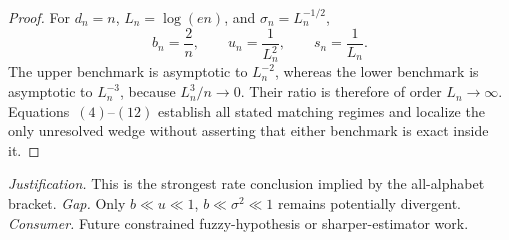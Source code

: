 \documentclass{article}
\begin{document}
\begin{proof}
For \(d_n=n\), \(L_n=\log(en)\), and \(\sigma_n=L_n^{-1/2}\),
\[
 b_n=\frac2n,\qquad u_n=\frac1{L_n^2},\qquad s_n=\frac1{L_n}.
\tag{13}
\]
The upper benchmark is asymptotic to \(L_n^{-2}\), whereas the lower benchmark is asymptotic to \(L_n^{-3}\), because \(L_n^3/n\to0\).  Their ratio is therefore of order \(L_n\to\infty\).  Equations~\((4)\)--\((12)\) establish all stated matching regimes and localize the only unresolved wedge without asserting that either benchmark is exact inside it.
\end{proof}
\par\smallskip\noindent \textit{Justification.} This is the strongest rate conclusion implied by the all-alphabet bracket. \textit{Gap.} Only \(b\ll u\ll1\), \(b\ll\sigma^2\ll1\) remains potentially divergent. \textit{Consumer.} Future constrained fuzzy-hypothesis or sharper-estimator work.
\end{document}
